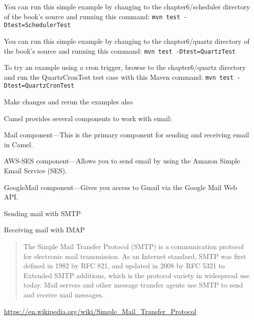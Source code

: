 \documentclass[Screen16to9,17pt]{foils}
\begin{document}


You can run this simple example by changing to the chapter6/scheduler directory of
the book’s source and running this command:
\verb+mvn test -Dtest=SchedulerTest+

You can run this simple example by changing to the chapter6/quartz directory of
the book’s source and running this command:
\verb+mvn test -Dtest=QuartzTest+

To try an example using a cron trigger, browse to the chapter6/quartz directory and
run the QuartzCronTest test case with this Maven command:
\verb+mvn test -Dtest=QuartzCronTest+

\vskip 2cm
\centerline{Make changes and rerun the examples also}



Camel provides several components to work with email:
\begin{list2}
\item Mail component—This is the primary component for sending and receiving email
in Camel.
\item  AWS-­SES component—Allows you to send email by using the Amazon Simple Email
Service (SES).
\item GoogleMail component—Gives you access to Gmail via the Google Mail Web API.
\end{list2}


\begin{list2}
\item Sending mail with SMTP
\item  Receiving mail with IMAP
\end{list2}



\begin{quote}
  The Simple Mail Transfer Protocol (SMTP) is a communication protocol for electronic mail transmission. As an Internet standard, SMTP was first defined in 1982 by RFC 821, and updated in 2008 by RFC 5321 to Extended SMTP additions, which is the protocol variety in widespread use today. Mail servers and other message transfer agents use SMTP to send and receive mail messages.
\end{quote}

\url{https://en.wikipedia.org/wiki/Simple_Mail_Transfer_Protocol}



\end{document}

